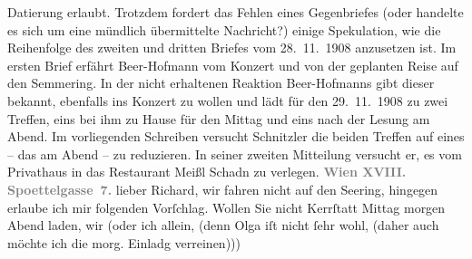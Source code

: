 \begin{ledgroupsized}[t]{13cm}
{{{                        Datierung erlaubt. Trotzdem fordert das Fehlen eines Gegenbriefes (oder
                        handelte es sich um eine mündlich übermittelte Nachricht?) einige
                        Spekulation, wie die Reihenfolge des zweiten und dritten Briefes vom
                           28. 11. 1908 anzusetzen ist. Im ersten Brief erfährt Beer-Hofmann vom Konzert und von der geplanten Reise
                        auf den Semmering. In der nicht
                        erhaltenen Reaktion Beer-Hofmanns
                        gibt dieser bekannt, ebenfalls ins Konzert zu wollen und lädt für den
                           29. 11. 1908 zu zwei Treffen, eins bei ihm zu Hause für den
                        Mittag und eins nach der Lesung am Abend. Im vorliegenden Schreiben versucht
                           Schnitzler die beiden Treffen auf
                        eines – das am Abend – zu reduzieren. In seiner zweiten Mitteilung versucht
                        er, es vom Privathaus in das Restaurant Meißl
                              {\kaufmannsund} Schadn zu verlegen.}}}\label{K_L01813_1h}\pend
           \pstart
           \textcolor{gray}{\textbf{Wien XVIII. Spoettelgasse 7.}}\pend
           \pstart
           lieber Richard, wir fahren nicht auf den Se{\geminationm}ering, hingegen erlaube ich mir
               folgenden Vorſchlag. Wollen Sie nicht Kerrſtatt Mittag morgen Abend laden, wir (oder ich
               allein, (denn {\pb}Olga iſt nicht ſehr wohl, (daher \introOben{}auch\introOben{} möchte ich die morg. Einladg verreinen)))

\end{ledgroupsized}
